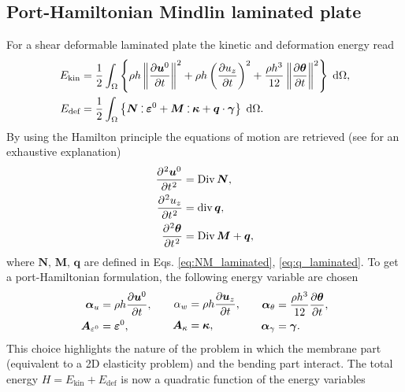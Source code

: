 \subsection{Port-Hamiltonian Mindlin laminated plate}
For a shear deformable laminated plate the kinetic and deformation energy read
\begin{equation*}
\begin{aligned}
E_{\text{kin}} &= \energy{\rho h \norm{\diffp{\bm{u}^0}{t}}^2 + \rho h \left(\diffp{u_z}{t}\right)^2 + \frac{\rho h^3}{12} \norm{\diffp{\bm{\theta}}{t}}^2}, \\
E_{\text{def}} &= \energy{\bm{N} \cddot \bm{\varepsilon}^0 + \bm{M} \cddot \bm{\kappa} + \bm{q} \cdot \bm{\gamma}}. 
\end{aligned}
\end{equation*}
By using the Hamilton principle the equations of motion are retrieved (see \cite[Chapter~3]{reddy2003mechanics} for an exhaustive explanation)
\begin{equation}\label{eq:sysLamMin}
	\begin{aligned}
	\diffp[2]{\bm{u}^0}{t} &= \Div \bm{N}, \\
	\diffp[2]{{u}_z}{t} &= \div \bm{q}, \\
	\diffp[2]{\bm{\theta}}{t} &= \Div \bm{M} + \bm{q}, \\
	\end{aligned}	
\end{equation}
where $\bm{N}, \, \bm{M}, \, \bm{q}$ are defined in Eqs. \eqref{eq:NM_laminated}, \eqref{eq:q_laminated}. 
To get a port-Hamiltonian formulation, the following energy variable are chosen
\begin{equation}
	\begin{aligned}
	\bm{\alpha}_u &= \rho h \diffp{\bm{u}^0}{t}, \\
	\bm{A}_{\varepsilon^0} &= \bm{\varepsilon}^0,
	\end{aligned} \qquad
	\begin{aligned}
	{\alpha}_w &= \rho h \diffp{\bm{u}_z}{t}, \\
	\bm{A}_{\kappa} &= \bm{\kappa},
	\end{aligned} \qquad
	\begin{aligned}
	\bm{\alpha}_\theta &= \frac{\rho h^3}{12} \diffp{\bm{\theta}}{t}, \\
	\bm{\alpha}_{\gamma} &= \bm{\gamma}.
	\end{aligned}
\end{equation} 
This choice highlights the nature of the problem in which the membrane part (equivalent to a 2D elasticity problem) and the bending part interact. The total energy $H=E_{\text{kin}} + E_{\text{def}}$ is now a quadratic function of the energy variables

